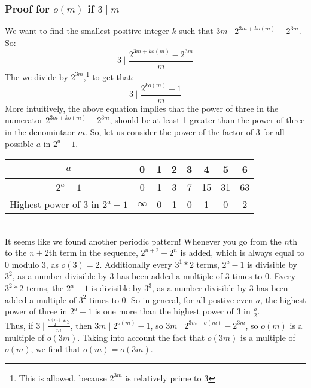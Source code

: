\documentclass{article}
\begin{document}
  \subsubsection{Proof for $o(m)$ if $3 \mid m$}
  We want to find the smallest positive integer $k$ such that $3m \mid 2^{3m + ko(m)} - 2^{3m}$. So:
  \begin{equation}
    3 \mid \frac{2^{3m + ko(m)} - 2^{3m}}{m}
  \end{equation}
   The we divide by $2^{3m}$,\footnote{This is allowed, because $2^{3m}$ is relatively prime to 3} to get that:
  \begin{equation}
    3 \mid \frac{2^{ko(m)}-1}{m}
  \end{equation}
  More intuitively, the above equation implies that the power of three in the numerator $2^{3m + ko(m)}-2^{3m}$, should be at least 1 greater than the power of three in the denomintaor $m$. So, let us consider the power of the factor of 3 for all possible $a$ in $2^a-1$.\\
  \begin{tabular} {|c|c|c|c|c|c|c|c|}
    \hline $a$                             & 0 & 1 & 2 & 3 & 4  &  5 & 6 \\
    \hline $2^a-1$                         & 0 & 1 & 3 & 7 & 15 & 31 & 63\\
    \hline Highest power of 3 in $2^a-1$   & $\infty$ & 0 & 1 & 0 & 1  & 0  & 2 \\
    \hline 
  \end{tabular}\\
  
  It seems like we found another periodic pattern! Whenever you go from the $n$th to the $n+2$th term in the sequence, $2^{n+2} - 2^n$ is added, which is always equal to 0 modulo 3, as $o(3) = 2$. Additionally every $3^1*2$ terms, $2^a-1$ is divisible by $3^2$, as a number divisible by 3 has been added a multiple of 3 times to 0. Every $3^2*2$ terms, the $2^a-1$ is divisible by $3^3$, as a number divisible by 3 has been added a multiple of $3^2$ times to 0. So in general, for all postive even $a$, the highest power of three in $2^a - 1$ is one more than the highest power of 3 in $\frac{a}{2}$.\\

  Thus, if $3 \mid \frac{\frac{o(m)}{2} * 3}{m}$, then $3m \mid 2^{o(m)}-1$, so $3m \mid 2^{3m + o(m)}-2^{3m}$, so $o(m)$ is a multiple of $o(3m)$. Taking into account the fact that $o(3m)$ is a multiple of $o(m)$, we find that $o(m)= o(3m)$.\\
\end{document}
